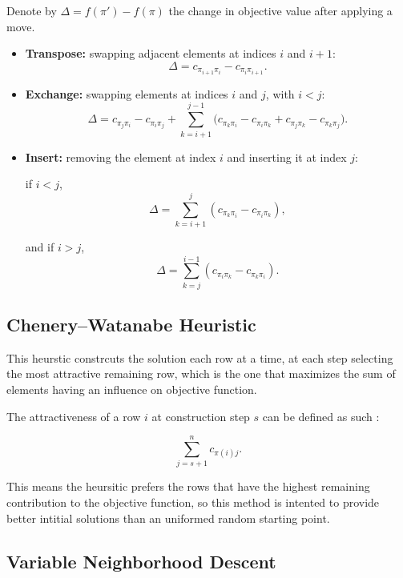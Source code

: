 Denote by \(\Delta = f(\pi')-f(\pi)\) the change in objective value after applying a move.

\begin{itemize}[leftmargin=1.5em]
    \item \textbf{Transpose:} swapping adjacent elements at indices \(i\) and \(i+1\):
    \[
    \Delta = c_{\pi_{i+1}\pi_i} - c_{\pi_i\pi_{i+1}}.
    \]

    \item \textbf{Exchange:} swapping elements at indices \(i\) and \(j\), with \(i<j\):
    \[
    \Delta
    =
    c_{\pi_j\pi_i}-c_{\pi_i\pi_j}
    +
    \sum_{k=i+1}^{j-1}
    \Big(
    c_{\pi_k\pi_i}-c_{\pi_i\pi_k}
    +
    c_{\pi_j\pi_k}-c_{\pi_k\pi_j}
    \Big).
    \]

    \item \textbf{Insert:} removing the element at index \(i\) and inserting it at index \(j\):
    
    if \(i<j\),
    \[
    \Delta
    =
    \sum_{k=i+1}^{j}
    \left(
    c_{\pi_k\pi_i}-c_{\pi_i\pi_k}
    \right),
    \]
    
    and if \(i>j\),
    \[
    \Delta
    =
    \sum_{k=j}^{i-1}
    \left(
    c_{\pi_i\pi_k}-c_{\pi_k\pi_i}
    \right).
    \]
\end{itemize}


\subsection{Chenery--Watanabe Heuristic}

This heurstic constrcuts the solution each row at a time, at each step selecting the most attractive remaining row, which is the one that maximizes the sum of elements having an influence on objective function.

The attractiveness of a row \(i\) at construction step \(s\) can be defined as such :

\[
\sum_{j=s+1}^{n} c_{\pi(i)j}.
\]

This means the heursitic prefers the rows that have the highest remaining contribution to the objective function, so this method is intented to provide better intitial solutions than an uniformed random starting point.



\subsection{Variable Neighborhood Descent}

